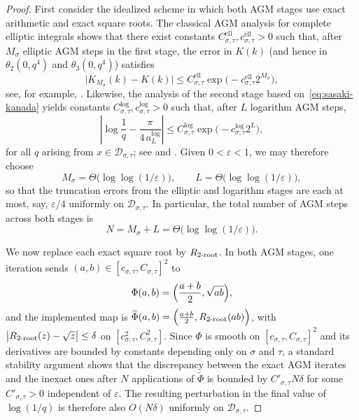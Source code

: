 \documentclass{article}
\theoremstyle{plain}
\theoremstyle{definition}
\theoremstyle{remark}
\begin{document}
\begin{proof}
First consider the idealized scheme in which both AGM stages use exact arithmetic and exact square roots. The classical AGM analysis for complete elliptic integrals shows that there exist constants $C^{\mathrm{ell}}_{\sigma,\tau},c^{\mathrm{ell}}_{\sigma,\tau}>0$ such that, after $M_\sigma$ elliptic AGM steps in the first stage, the error in $K(k)$ (and hence in $\theta_2(0,q^4)$ and $\theta_3(0,q^4)$) satisfies
\[
\bigl|K_{M_\sigma}(k)-K(k)\bigr|
\le
C^{\mathrm{ell}}_{\sigma,\tau}\exp\bigl(-c^{\mathrm{ell}}_{\sigma,\tau}2^{M_\sigma}\bigr),
\]
see, for example,  {\citet[Chs.~2 and 7]{borwein1987piagm}}. Likewise, the analysis of the second stage based on~\cref{eq:sasaki-kanada} yields constants $C^{\log}_{\sigma,\tau},c^{\log}_{\sigma,\tau}>0$ such that, after $L$ logarithm AGM steps,
\[
\left|
\log\frac{1}{q}
-
\frac{\pi}{4\,a_L^{\log}}
\right|
\le
C^{\log}_{\sigma,\tau}\exp\bigl(-c^{\log}_{\sigma,\tau} 2^L\bigr),
\]
for all $q$ arising from $x\in\mathcal D_{\sigma,\tau}$; see  {\citet{sasaki1982log} and \citet[Eq.~(40)]{brent2018borwein}}.
Given $0<\varepsilon<1$, we may therefore choose
\[
M_\sigma=\Theta\!\bigl(\log\log(1/\varepsilon)\bigr),
\qquad
L=\Theta\!\bigl(\log\log(1/\varepsilon)\bigr),
\]
so that the truncation errors from the elliptic and logarithm stages are each at most, say, $\varepsilon/4$ uniformly on $\mathcal D_{\sigma,\tau}$. In particular, the total number of AGM steps across both stages is
\[
N = M_\sigma + L = \Theta\!\bigl(\log\log(1/\varepsilon)\bigr).
\]

We now replace each exact square root by $R_{2\textnormal{-root}}$. In both AGM stages, one iteration sends $(a,b)\in[c_{\sigma,\tau},C_{\sigma,\tau}]^2$ to
\[
\Phi(a,b)
=
\Bigl(\frac{a+b}{2},\sqrt{ab}\Bigr),
\]
and the implemented map is \(\widetilde\Phi(a,b)
=
\Bigl(\frac{a+b}{2},R_{2\textnormal{-root}}(ab)\Bigr)\), with \(\bigl|R_{2\textnormal{-root}}(z)-\sqrt{z}\bigr|\le\delta\) on $[c_{\sigma,\tau}^2,C_{\sigma,\tau}^2]$. Since $\Phi$ is smooth on $[c_{\sigma,\tau},C_{\sigma,\tau}]^2$ and its derivatives are bounded by constants depending only on $\sigma$ and $\tau$, a standard stability argument shows that the discrepancy between the exact AGM iterates and the inexact ones after $N$ applications of $\widetilde\Phi$ is bounded by $C'_{\sigma,\tau} N\delta$ for some $C'_{\sigma,\tau}>0$ independent of $\varepsilon$. The resulting perturbation in the final value of $\log(1/q)$ is therefore also $O(N\delta)$ uniformly on $\mathcal D_{\sigma,\tau}$.


\end{proof}
\end{document}
